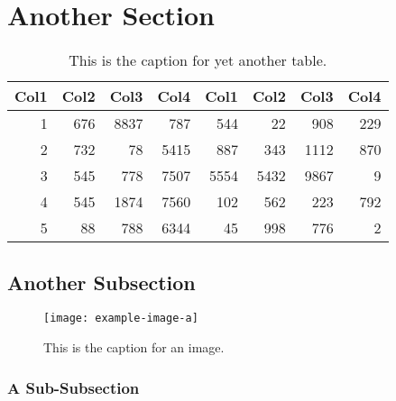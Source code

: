 \section{Another Section}
\lipsum[1-2]
\begin{table}
	\centering
	\begin{tabular}{r r r r r r r r}
		Col1 & Col2 & Col3 & Col4 & Col1 & Col2 & Col3 & Col4 \\
		\hline
		1    & 676  & 8837 & 787  & 544  & 22   & 908  & 229  \\
		2    & 732  & 78   & 5415 & 887  & 343  & 1112 & 870  \\
		3    & 545  & 778  & 7507 & 5554 & 5432 & 9867 & 9    \\
		4    & 545  & 1874 & 7560 & 102  & 562  & 223  & 792  \\
		5    & 88   & 788  & 6344 & 45   & 998  & 776  & 2    \\
		\hline
	\end{tabular}
	\caption{This is the caption for yet another table.}
\end{table}

\subsection{Another Subsection}
\lipsum[3-5]
\begin{figure}
	\centering
	\texttt{[image: example-image-a]}
	\caption{This is the caption for an image.}
\end{figure}

\subsubsection{A Sub-Subsection}
\lipsum[6-8]
